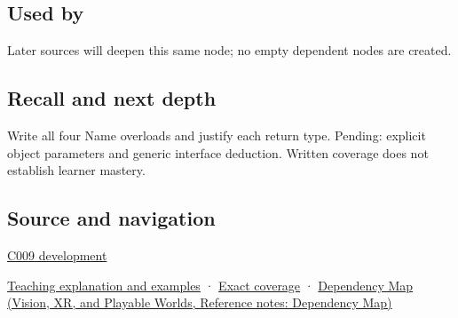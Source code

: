 \subsection{Used by}\label{appendix-d42039b1d6f7-used-by}

Later sources will deepen this same node; no empty dependent nodes are created.

\subsection{Recall and next depth}\label{appendix-d42039b1d6f7-recall-and-next-depth}

Write all four Name overloads and justify each return type. Pending: explicit object parameters and generic interface deduction. Written coverage does not establish learner mastery.

\subsection{Source and navigation}\label{appendix-d42039b1d6f7-source-and-navigation}

\hyperref[appendix-fd090d982a15-m009---parts-127-147]{C009 development}

\hyperref[01-foundations-i-ch003-an-accessor-must-respect-the-callers-lifetime]{Teaching explanation and examples} · \hyperref[appendix-fd090d982a15-m008---parts-113-126]{Exact coverage} · \href{../07-Vision-XR-and-Playable-Worlds/main.pdf\#nameddest=appendix-4ad47bdd269a}{Dependency Map (Vision, XR, and Playable Worlds, Reference notes: Dependency Map)}
